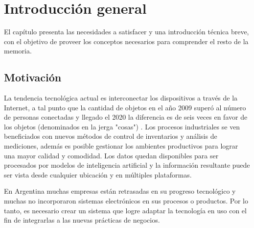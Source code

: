 
\chapter{Introducción general} %

\label{Chapter1} %
\label{IntroGeneral}


\newcommand{\keyword}[1]{\textbf{#1}}
\newcommand{\tabhead}[1]{\textbf{#1}}
\newcommand{\code}[1]{\texttt{#1}}
\newcommand{\file}[1]{\texttt{\bfseries#1}}
\newcommand{\option}[1]{\texttt{\itshape#1}}
\newcommand{\grados}{$^{\circ}$}



El capítulo presenta las necesidades a satisfacer y una introducción técnica breve, con el objetivo de proveer los conceptos necesarios para comprender el resto de la memoria.

\section{Motivación}
\label{ch1Motivacion}

La tendencia tecnológica actual es interconectar los dispositivos a través de la Internet, a tal punto que la cantidad de objetos en el año 2009 superó al número de personas conectadas y llegado el 2020 la diferencia es de seis veces en favor de los objetos (denominados en la jerga "cosas") \citep{ARTICLE:DaveEvans}.
Los procesos industriales se ven beneficiados con nuevos métodos de control de inventarios y análisis de mediciones, además es posible gestionar los ambientes productivos para lograr una mayor calidad y comodidad.
Los datos quedan disponibles para ser procesados por modelos de inteligencia artificial y la información resultante puede ser vista desde cualquier ubicación y en múltiples plataformas. 

En Argentina muchas empresas están retrasadas en su progreso tecnológico y muchas no incorporaron sistemas electrónicos en sus procesos o productos.
Por lo tanto, es necesario crear un sistema que logre adaptar la tecnología en uso con el fin de integrarlas a las nuevas prácticas de negocios.

